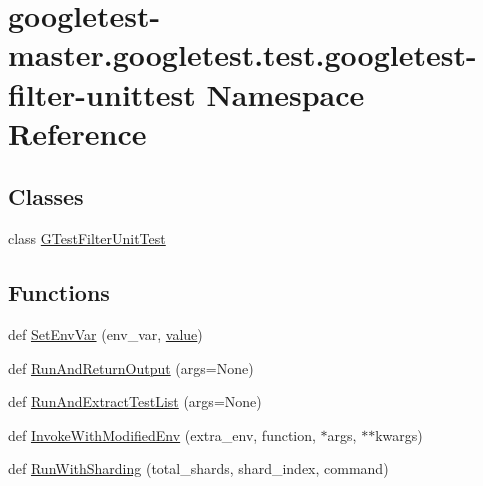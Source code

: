 \hypertarget{namespacegoogletest-master_1_1googletest_1_1test_1_1googletest-filter-unittest}{}\section{googletest-\/master.googletest.\+test.\+googletest-\/filter-\/unittest Namespace Reference}
\label{namespacegoogletest-master_1_1googletest_1_1test_1_1googletest-filter-unittest}
\subsection*{Classes}
\begin{DoxyCompactItemize}
\item 
class \mbox{\hyperlink{classgoogletest-master_1_1googletest_1_1test_1_1googletest-filter-unittest_1_1_g_test_filter_unit_test}{G\+Test\+Filter\+Unit\+Test}}
\end{DoxyCompactItemize}
\subsection*{Functions}
\begin{DoxyCompactItemize}
\item 
def \mbox{\hyperlink{namespacegoogletest-master_1_1googletest_1_1test_1_1googletest-filter-unittest_afb1b504e097c1bf6246243803354a46b}{Set\+Env\+Var}} (env\+\_\+var, \mbox{\hyperlink{_obj__test_2lib_2googletest-master_2googlemock_2test_2gmock-matchers__test_8cc_a337b8a670efc0b086ad3af163f3121b6}{value}})
\item 
def \mbox{\hyperlink{namespacegoogletest-master_1_1googletest_1_1test_1_1googletest-filter-unittest_a1b526423ac72dca36b8ca7c8b4c8f25a}{Run\+And\+Return\+Output}} (args=None)
\item 
def \mbox{\hyperlink{namespacegoogletest-master_1_1googletest_1_1test_1_1googletest-filter-unittest_a18d060186cd1bd2592dce0761ec029e5}{Run\+And\+Extract\+Test\+List}} (args=None)
\item 
def \mbox{\hyperlink{namespacegoogletest-master_1_1googletest_1_1test_1_1googletest-filter-unittest_a7e4dd2054503003db0d6b42edc1c6815}{Invoke\+With\+Modified\+Env}} (extra\+\_\+env, function, $\ast$args, $\ast$$\ast$kwargs)
\item 
def \mbox{\hyperlink{namespacegoogletest-master_1_1googletest_1_1test_1_1googletest-filter-unittest_a9fe0857d188f2b2832d1dc102f5ca71a}{Run\+With\+Sharding}} (total\+\_\+shards, shard\+\_\+index, command)
\end{DoxyCompactItemize}
